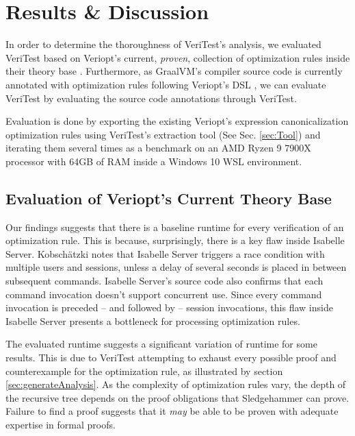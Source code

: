 \chapter{Results \& Discussion \label{sec:results}}

In order to determine the thoroughness of VeriTest's analysis, we evaluated VeriTest based on Veriopt's current, \emph{proven}, collection of 
optimization rules inside their theory base \cite{Term_Graph_Optimizations}. Furthermore, as GraalVM's compiler source code is currently annotated 
with optimization rules following Veriopt's DSL \cite[Sec. 5.1]{Term_Graph_Optimizations}, we can evaluate VeriTest by evaluating the source 
code annotations through VeriTest.

Evaluation is done by exporting the existing Veriopt's expression canonicalization optimization rules using VeriTest's extraction tool 
(See Sec. \ref{sec:Tool}) and iterating them several times as a benchmark on an AMD Ryzen 9 7900X processor with 64GB of RAM inside a 
Windows 10 WSL environment.

\section{Evaluation of Veriopt's Current Theory Base}


Our findings suggests that there is a baseline runtime for every verification of an optimization rule. This is because, surprisingly, there is a 
key flaw inside Isabelle Server. Kobschätzki \cite{kobschatzki_unexpected_2024} notes that Isabelle Server triggers a race condition with multiple 
users and sessions, unless a delay of several seconds is placed in between subsequent commands. Isabelle Server's source code also confirms that 
each command invocation doesn't support concurrent use. Since every command invocation is preceded -- and followed by -- session invocations, 
this flaw inside Isabelle Server presents a bottleneck for processing optimization rules.


The evaluated runtime suggests a significant variation of runtime for some results.
This is due to VeriTest attempting to exhaust every possible proof and counterexample for the optimization rule, as illustrated by section 
\ref{sec:generateAnalysis}. As the complexity of optimization rules vary, the depth of the recursive tree depends on the proof obligations that 
Sledgehammer can prove. Failure to find a proof suggests that it \emph{may} be able to be proven with adequate expertise in formal proofs.

